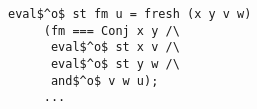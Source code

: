 \begin{figure}[!t]
  \centering
  \begin{minipage}{0.75\textwidth}
    \begin{lstlisting}[frame=tb]
 eval$^o$ st fm u = fresh (x y v w)
     (fm === Conj x y /\
      eval$^o$ st x v /\ 
      eval$^o$ st y w /\ 
      and$^o$ v w u);
     ...
    \end{lstlisting}
  \end{minipage}
\end{figure}
